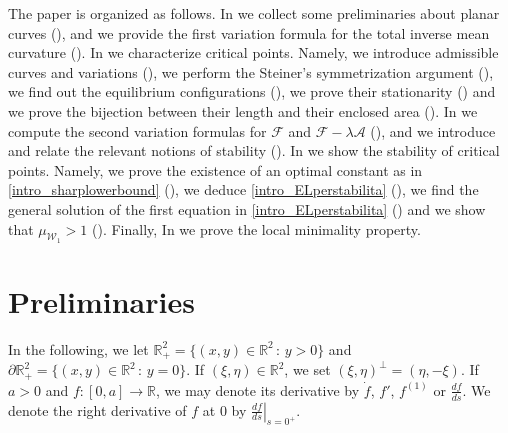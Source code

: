 \documentclass[11pt]{amsart}
\newcommand{\A}{\mathcal A}
\newcommand{\F}{\mathcal F}
\newcommand{\rr}{{\mathbb{R}}}
\theoremstyle{definition}
\theoremstyle{remark}
\numberwithin{equation}{section}
\begin{document}
	The paper is organized as follows. In  we collect some preliminaries about planar curves (), and we provide the first variation formula for the total inverse mean curvature (). In  we characterize critical points. Namely, we introduce admissible curves and variations (), we perform the Steiner's symmetrization argument (), we find out the equilibrium configurations (), we prove their stationarity () and we prove the bijection between their length and their enclosed area (). In  we compute the second variation formulas for $\F$ and $\F-\lambda\A$ (), and we introduce and relate the relevant notions of stability (). In  we show the stability of critical points. Namely, we prove the existence of an optimal constant as in \eqref{intro_sharplowerbound} (), we deduce \eqref{intro_ELperstabilita} (), we find the general solution of the first equation in \eqref{intro_ELperstabilita} () and we show that $\mu_{\mathcal W_1}>1$ (). Finally, In  we prove the local minimality property. 
	
	\section{Preliminaries}\label{sec_preliminaries}
	In the following, we let $\rr^2_+=\{(x,y)\in\rr^2\,:\,y>0\}$ and $\partial\rr^2_+=\{(x,y)\in\rr^2\,:\,y=0\}.$
	If $(\xi,\eta)\in\rr^2$, we set $(\xi,\eta)^\perp=(\eta,-\xi).$ If $a>0$ and $f:[0,a]\to \rr$, we may denote its derivative by $\dot f$, $f'$, $f^{(1)}$ or $\frac{df}{ds}$. We denote the right derivative of $f$ at $0$ by $\left.\frac{df}{ds}\right|_{s=0^+}$.
\end{document}
